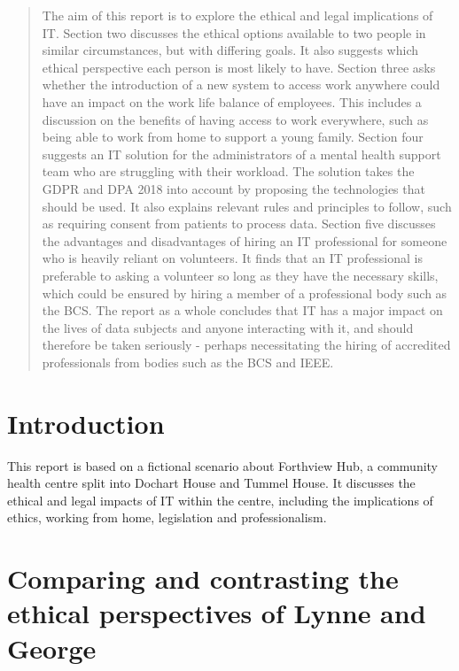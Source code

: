 \documentclass[12pt,a4paper]{article}
\begin{document}
\begin{abstract}
\noindent
The aim of this report is to explore the ethical and legal implications of IT. Section two discusses the ethical options available to two people in similar circumstances, but with differing goals. It also suggests which ethical perspective each person is most likely to have. Section three asks whether the introduction of a new system to access work anywhere could have an impact on the work life balance of employees. This includes a discussion on the benefits of having access to work everywhere, such as being able to work from home to support a young family. Section four suggests an IT solution for the administrators of a mental health support team who are struggling with their workload. The solution takes the GDPR and DPA 2018 into account by proposing the technologies that should be used. It also explains relevant rules and principles to follow, such as requiring consent from patients to process data. Section five discusses the advantages and disadvantages of hiring an IT professional for someone who is heavily reliant on volunteers. It finds that an IT professional is preferable to asking a volunteer so long as they have the necessary skills, which could be ensured by hiring a member of a professional body such as the BCS.
The report as a whole concludes that IT has a major impact on the lives of data subjects and anyone interacting with it, and should therefore be taken seriously - perhaps necessitating the hiring of accredited professionals from bodies such as the BCS and IEEE.

\end{abstract}
\newpage

\tableofcontents

\newpage

\section{Introduction}
This report is based on a fictional scenario about Forthview Hub, a community health centre split into Dochart House and Tummel House. It discusses the ethical and legal impacts of IT within the centre, including the implications of ethics, working from home, legislation and professionalism.

\section{Comparing and contrasting the ethical perspectives of Lynne and George}
\end{document}
